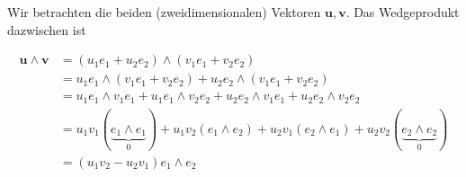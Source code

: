 \begin{definition}
  Wir betrachten die beiden (zweidimensionalen) Vektoren $\mathbf{u},
  \mathbf{v}$.
  Das Wedgeprodukt dazwischen ist

  \begin{equation}
    \begin{aligned}
    \mathbf{u} \wedge \mathbf{v} &= (u_1 e_1 + u_2 e_2) \wedge
    (v_1 e_1 + v_2 e_2) \\
    &= u_1 e_1 \wedge (v_1 e_1 + v_2 e_2) + u_2 e_2 \wedge (v_1 e_1 + v_2 e_2) \\
    &= u_1 e_1 \wedge v_1 e_1 + u_1 e_1 \wedge v_2 e_2 + u_2 e_2 \wedge v_1 e_1 + u_2 e_2 \wedge v_2 e_2 \\
    &= u_1 v_1 (\underbrace{e_1 \wedge e_1}_{0}) + u_1 v_2 (e_1 \wedge e_2) + u_2 v_1 (e_2 \wedge e_1) + u_2 v_2 (\underbrace{e_2 \wedge e_2}_{0}) \\
    &= (u_1 v_2 - u_2 v_1) e_1 \wedge e_2
    \end{aligned}
  \end{equation}
\end{definition}
